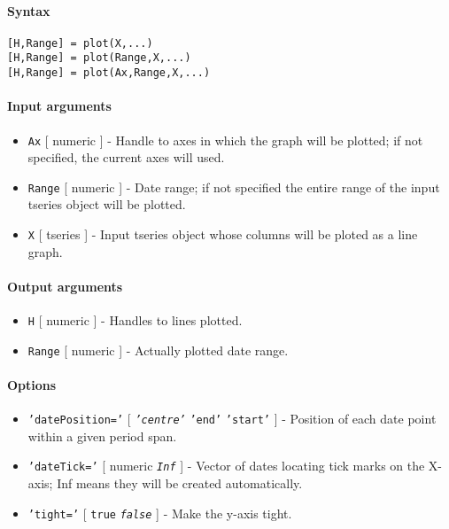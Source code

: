 


	\paragraph{Syntax}\label{syntax}

\begin{verbatim}
[H,Range] = plot(X,...)
[H,Range] = plot(Range,X,...)
[H,Range] = plot(Ax,Range,X,...)
\end{verbatim}

\paragraph{Input arguments}\label{input-arguments}

\begin{itemize}
\item
  \texttt{Ax} {[} numeric {]} - Handle to axes in which the graph will
  be plotted; if not specified, the current axes will used.
\item
  \texttt{Range} {[} numeric {]} - Date range; if not specified the
  entire range of the input tseries object will be plotted.
\item
  \texttt{X} {[} tseries {]} - Input tseries object whose columns will
  be ploted as a line graph.
\end{itemize}

\paragraph{Output arguments}\label{output-arguments}

\begin{itemize}
\item
  \texttt{H} {[} numeric {]} - Handles to lines plotted.
\item
  \texttt{Range} {[} numeric {]} - Actually plotted date range.
\end{itemize}

\paragraph{Options}\label{options}

\begin{itemize}
\item
  \texttt{'datePosition='} {[} \emph{\texttt{'centre'}} \textbar{}
  \texttt{'end'} \textbar{} \texttt{'start'} {]} - Position of each date
  point within a given period span.
\item
  \texttt{'dateTick='} {[} numeric \textbar{} \emph{\texttt{Inf}} {]} -
  Vector of dates locating tick marks on the X-axis; Inf means they will
  be created automatically.
\item
  \texttt{'tight='} {[} \texttt{true} \textbar{} \emph{\texttt{false}}
  {]} - Make the y-axis tight.
\end{itemize}


